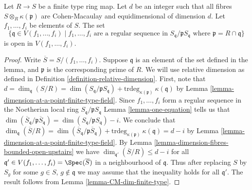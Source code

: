 \begin{lemma}
\label{lemma-open-regular-sequence}
Let $R \to S$ be a finite type ring map. Let $d$ be an integer such that all
fibres $S \otimes_R \kappa(\mathfrak p)$ are Cohen-Macaulay and equidimensional
of dimension $d$. Let $f_1, \ldots, f_i$ be elements of $S$. The set
$$
\{ \mathfrak q \in V(f_1, \ldots, f_i)
\mid f_1, \ldots, f_i
\text{ are a regular sequence in }
S_{\mathfrak q}/\mathfrak p S_{\mathfrak q}
\text{ where }\mathfrak p = R \cap \mathfrak q
\}
$$
is open in $V(f_1, \ldots, f_i)$.
\end{lemma}

\begin{proof}
Write $\overline{S} = S/(f_1, \ldots, f_i)$.
Suppose $\mathfrak q$ is an element of the set defined in the
lemma, and $\mathfrak p$ is the corresponding prime of $R$.
We will use relative dimension as defined in
Definition \ref{definition-relative-dimension}.
First, note that $d = \dim_{\mathfrak q}(S/R) =
\dim(S_{\mathfrak q}/\mathfrak pS_{\mathfrak q}) +
\text{trdeg}_{\kappa(\mathfrak p)}\ \kappa(\mathfrak q)$
by Lemma \ref{lemma-dimension-at-a-point-finite-type-field}.
Since $f_1, \ldots, f_i$ form a regular sequence in the
Noetherian local ring $S_{\mathfrak q}/\mathfrak pS_{\mathfrak q}$
Lemma \ref{lemma-one-equation} tells us that
$\dim(\overline{S}_{\mathfrak q}/\mathfrak p\overline{S}_{\mathfrak q})
= \dim(S_{\mathfrak q}/\mathfrak pS_{\mathfrak q}) - i$.
We conclude that $\dim_{\mathfrak q}(\overline{S}/R)
= \dim(\overline{S}_{\mathfrak q}/\mathfrak p\overline{S}_{\mathfrak q}) +
\text{trdeg}_{\kappa(\mathfrak p)}\ \kappa(\mathfrak q)
= d - i$ by Lemma \ref{lemma-dimension-at-a-point-finite-type-field}.
By Lemma \ref{lemma-dimension-fibres-bounded-open-upstairs}
we have $\dim_{\mathfrak q'}(\overline{S}/R) \leq d - i$
for all $\mathfrak q' \in V(f_1, \ldots, f_i) = \Spec(\overline{S})$
in a neighbourhood of $\mathfrak q$. Thus after replacing
$S$ by $S_g$ for some $g \in S$, $g \not \in \mathfrak q$
we may assume that the inequality holds for all
$\mathfrak q'$. The result follows from Lemma
\ref{lemma-CM-dim-finite-type}.
\end{proof}
